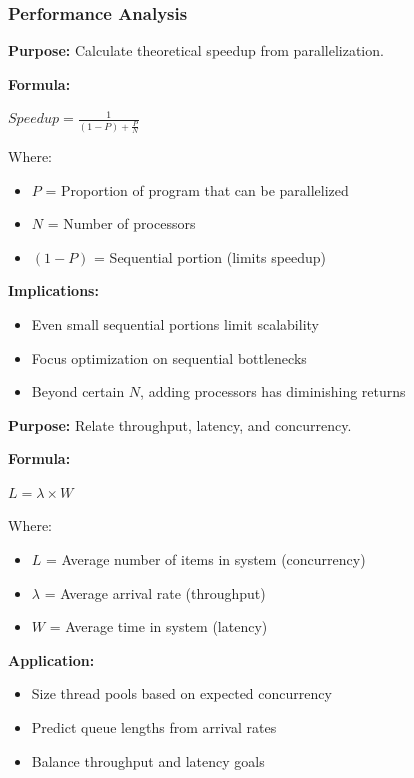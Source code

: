 \documentclass[11pt,letterpaper]{article}
\begin{document}
\subsubsection{Performance Analysis}

\begin{definitionbox}
\textbf{Purpose:} Calculate theoretical speedup from parallelization.

\textbf{Formula:}
\begin{center}
$Speedup = \frac{1}{(1-P) + \frac{P}{N}}$
\end{center}

Where:
\begin{itemize}[nosep]
    \item $P$ = Proportion of program that can be parallelized
    \item $N$ = Number of processors
    \item $(1-P)$ = Sequential portion (limits speedup)
\end{itemize}

\textbf{Implications:}
\begin{itemize}[nosep]
    \item Even small sequential portions limit scalability
    \item Focus optimization on sequential bottlenecks
    \item Beyond certain $N$, adding processors has diminishing returns
\end{itemize}
\end{definitionbox}

\begin{definitionbox}
\textbf{Purpose:} Relate throughput, latency, and concurrency.

\textbf{Formula:}
\begin{center}
$L = \lambda \times W$
\end{center}

Where:
\begin{itemize}[nosep]
    \item $L$ = Average number of items in system (concurrency)
    \item $\lambda$ = Average arrival rate (throughput)
    \item $W$ = Average time in system (latency)
\end{itemize}

\textbf{Application:}
\begin{itemize}[nosep]
    \item Size thread pools based on expected concurrency
    \item Predict queue lengths from arrival rates
    \item Balance throughput and latency goals
\end{itemize}
\end{definitionbox}
\end{document}
